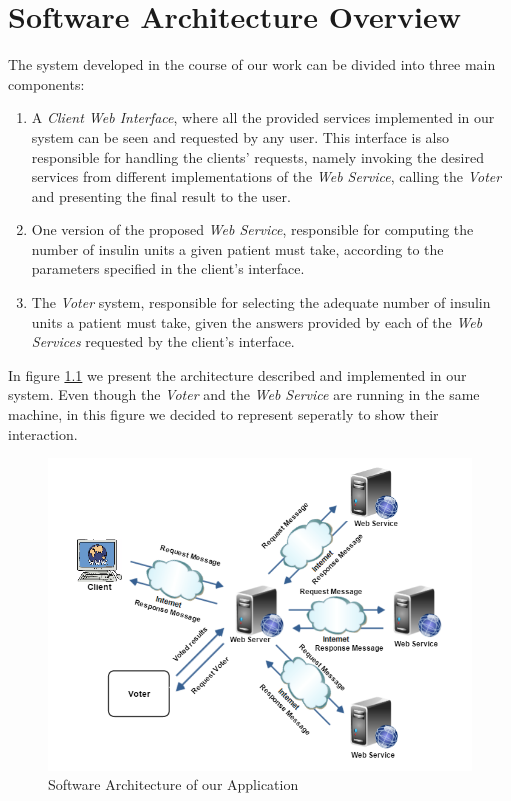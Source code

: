 \chapter{Software Architecture Overview}
\label{overview}

The system developed in the course of our work can be divided into three main components:

\begin{enumerate}
\item A \emph{Client Web Interface}, where all the provided services implemented in our system can be seen and requested by any user. This interface is also responsible for handling the clients' requests, namely invoking the desired services from different implementations of the \emph{Web Service}, calling the \emph{Voter} and presenting the final result to the user.

\item One version of the proposed \emph{Web Service}, responsible for computing the number of insulin units a given patient must take, according to the parameters specified in the client's interface.

\item The \emph{Voter} system, responsible for selecting the adequate number of insulin units a patient must take, given the answers provided by each of the \emph{Web Services} requested by the client's interface.
\end{enumerate}

In figure \ref{architecture} we present the architecture described and implemented in our system. Even though the \emph{Voter} and the \emph{Web Service} are running in the same machine, in this figure we decided to represent seperatly to show their interaction.

\begin{figure}[H]
    \centering
	\includegraphics[keepaspectratio=true, scale=0.5]{Overview.png}
	\caption{Software Architecture of our Application}
	\label{architecture}
\end{figure}

